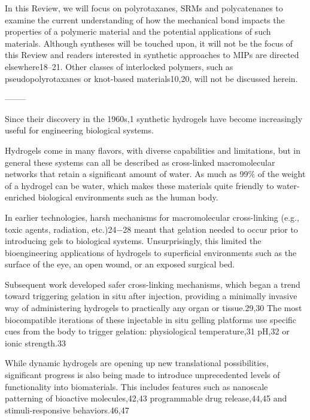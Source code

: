 \documentclass[../../main-notes.tex]{subfiles}
\begin{document}
In this Review, we will focus on polyrotaxanes, SRMs and polycatenanes to examine the current understanding of how the mechanical bond impacts the properties of a polymeric material and the potential applications of such materials. 
Although syntheses will be touched upon, it will not be the focus of this Review and readers interested in synthetic approaches to MIPs are directed elsewhere18–21. 
Other classes of interlocked polymers, such as pseudopolyrotaxanes or knot-based materials10,20, will not be discussed herein.

--------

\citep{correaTranslationalApplicationsHydrogels2021}

Since their discovery in the 1960s,1 synthetic hydrogels have become increasingly useful for engineering biological systems.

Hydrogels come in many flavors, with diverse capabilities and limitations, but in general these systems can all be described as cross-linked macromolecular networks that retain a significant amount of water. 
As much as 99\% of the weight of a hydrogel can be water, which makes these materials quite friendly to water-enriched biological environments such as the human body. 

In earlier technologies, harsh mechanisms for macromolecular cross-linking (e.g., toxic agents, radiation,  etc.)24−28 meant that gelation needed to occur prior to introducing gels to biological systems. 
Unsurprisingly, this limited the bioengineering applications of hydrogels to superficial environments such as the surface of the eye, an open wound, or an exposed surgical bed. 

Subsequent work developed safer cross-linking mechanisms, which began a trend toward triggering gelation in situ after injection, providing a minimally invasive way of administering  hydrogels to practically any organ or tissue.29,30 
The most biocompatible iterations of these injectable in situ gelling platforms use specific cues from the body to trigger gelation:  physiological temperature,31 pH,32 or ionic strength.33 

While dynamic hydrogels are opening up new translational possibilities, significant progress is also being made to introduce unprecedented levels of functionality into biomaterials. 
This includes features such as nanoscale patterning of  bioactive molecules,42,43 programmable drug release,44,45 and  stimuli-responsive behaviors.46,47 
\end{document}
